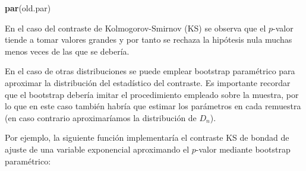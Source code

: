 \documentclass[]{book}
\newenvironment{Shaded}{\begin{snugshade}}{\end{snugshade}}
\newcommand{\KeywordTok}[1]{\textcolor[rgb]{0.13,0.29,0.53}{\textbf{#1}}}
\newcommand{\NormalTok}[1]{#1}
\theoremstyle{break}
\theoremstyle{definition}
\theoremstyle{definition}
\theoremstyle{definition}
\theoremstyle{remark}
\begin{document}
\begin{Shaded}
\begin{Highlighting}[]
\KeywordTok{par}\NormalTok{(old.par)}
\end{Highlighting}
\end{Shaded}

En el caso del contraste de Kolmogorov-Smirnov (KS) se observa que el
\(p\)-valor tiende a tomar valores grandes y por tanto se rechaza la
hipótesis nula muchas menos veces de las que se debería.

En el caso de otras distribuciones se puede emplear bootstrap
paramétrico para aproximar la distribución del estadístico del
contraste. Es importante recordar que el bootstrap debería imitar el
procedimiento empleado sobre la muestra, por lo que en este caso también
habría que estimar los parámetros en cada remuestra (en caso contrario
aproximaríamos la distribución de \(D_n\)).

Por ejemplo, la siguiente función implementaría el contraste KS de
bondad de ajuste de una variable exponencial aproximando el \(p\)-valor
mediante bootstrap paramétrico:
\end{document}
